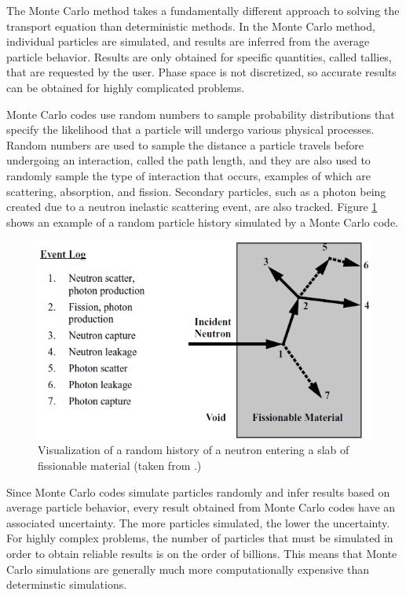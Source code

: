 The Monte Carlo method takes a fundamentally different approach to solving the transport equation than deterministic methods.
In the Monte Carlo method, individual particles are simulated, and results are inferred from the average particle behavior.
Results are only obtained for specific quantities, called tallies, that are requested by the user.
Phase space is not discretized, so accurate results can be obtained for highly complicated problems.

Monte Carlo codes use random numbers to sample probability distributions that specify the likelihood that a particle will undergo various physical processes.
Random numbers are used to sample the distance a particle travels before undergoing an interaction, called the path length, and they are also used to randomly sample the type of interaction that occurs, examples of which are scattering, absorption, and fission.
Secondary particles, such as a photon being created due to a neutron inelastic scattering event, are also tracked.
Figure \ref{fig:bg:monte-carlo} shows an example of a random particle history simulated by a Monte Carlo code. 

\begin{figure}[h!]
  \centering
  \includegraphics[width=1.0\textwidth]{content/background/monte_carlo.png}
  \caption{Visualization of a random history of a neutron entering a slab of fissionable material (taken from \cite{mcnp5_vol1}.)}
  \label{fig:bg:monte-carlo}
\end{figure}

Since Monte Carlo codes simulate particles randomly and infer results based on average particle behavior, every result obtained from Monte Carlo codes have an associated uncertainty.
The more particles simulated, the lower the uncertainty.
For highly complex problems, the number of particles that must be simulated in order to obtain reliable results is on the order of billions.
This means that Monte Carlo simulations are generally much more computationally expensive than determinstic simulations.

